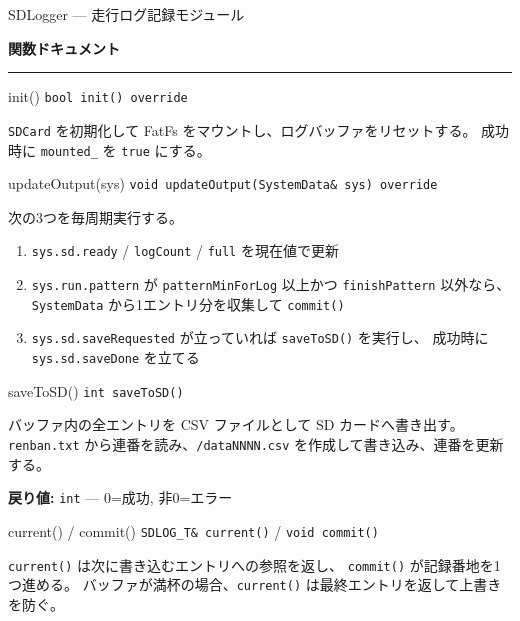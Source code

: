 \documentclass[a4paper,11pt,dvipdfmx]{jsarticle}
\makeatletter
\newcommand{\apisection}[1]{%
  \par\addvspace{4mm}%
  {\normalsize\bfseries\color{headerblue} #1}%
  \par\vspace{-1mm}%
  {\color{accentblue!40}\rule{\linewidth}{0.5pt}}%
  \par\nobreak\vspace{2mm}%
  \@afterheading
}
\makeatother
\begin{document}
\begin{apibox}{SDLogger --- 走行ログ記録モジュール}
\apisection{関数ドキュメント}

\begin{funcblock}{init()}
\texttt{bool init() override}

\vspace{1.5mm}
\texttt{SDCard} を初期化して FatFs をマウントし、ログバッファをリセットする。
成功時に \texttt{mounted\_} を \texttt{true} にする。
\end{funcblock}

\begin{funcblock}{updateOutput(sys)}
\texttt{void updateOutput(SystemData\& sys) override}

\vspace{1.5mm}
次の3つを毎周期実行する。

\begin{enumerate}[nosep, leftmargin=*]
  \item \texttt{sys.sd.ready} / \texttt{logCount} / \texttt{full} を現在値で更新
  \item \texttt{sys.run.pattern} が \texttt{patternMinForLog} 以上かつ
        \texttt{finishPattern} 以外なら、\texttt{SystemData} から1エントリ分を収集して \texttt{commit()}
  \item \texttt{sys.sd.saveRequested} が立っていれば \texttt{saveToSD()} を実行し、
        成功時に \texttt{sys.sd.saveDone} を立てる
\end{enumerate}
\end{funcblock}

\begin{funcblock}{saveToSD()}
\texttt{int saveToSD()}

\vspace{1.5mm}
バッファ内の全エントリを CSV ファイルとして SD カードへ書き出す。
\texttt{renban.txt} から連番を読み、\texttt{/dataNNNN.csv} を作成して書き込み、連番を更新する。

\vspace{1.5mm}
\textbf{戻り値:} \texttt{int} --- 0=成功, 非0=エラー
\end{funcblock}

\begin{funcblock}{current() / commit()}
\texttt{SDLOG\_T\& current()} / \texttt{void commit()}

\vspace{1.5mm}
\texttt{current()} は次に書き込むエントリへの参照を返し、
\texttt{commit()} が記録番地を1つ進める。
バッファが満杯の場合、\texttt{current()} は最終エントリを返して上書きを防ぐ。
\end{funcblock}


\end{apibox}
\end{document}
